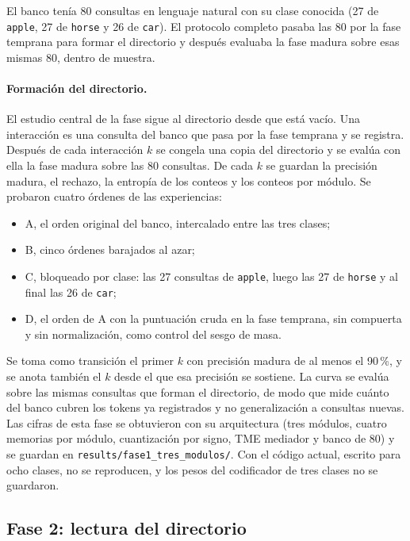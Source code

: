 El banco tenía 80 consultas en lenguaje natural con su clase conocida (27 de
\texttt{apple}, 27 de \texttt{horse} y 26 de \texttt{car}).
El protocolo completo pasaba las 80 por la fase temprana para formar el directorio y
después evaluaba la fase madura sobre esas mismas 80, dentro de muestra.

\paragraph{Formación del directorio.}
El estudio central de la fase sigue al directorio desde que está vacío.
Una interacción es una consulta del banco que pasa por la fase temprana y se registra.
Después de cada interacción $k$ se congela una copia del directorio y se evalúa con ella
la fase madura sobre las 80 consultas.
De cada $k$ se guardan la precisión madura, el rechazo, la entropía de los conteos y los
conteos por módulo.
Se probaron cuatro órdenes de las experiencias:
\begin{itemize}
    \item A, el orden original del banco, intercalado entre las tres clases;
    \item B, cinco órdenes barajados al azar;
    \item C, bloqueado por clase: las 27 consultas de \texttt{apple}, luego las 27 de
    \texttt{horse} y al final las 26 de \texttt{car};
    \item D, el orden de A con la puntuación cruda en la fase temprana, sin compuerta y
    sin normalización, como control del sesgo de masa.
\end{itemize}
Se toma como transición el primer $k$ con precisión madura de al menos el 90\,\%, y se
anota también el $k$ desde el que esa precisión se sostiene.
La curva se evalúa sobre las mismas consultas que forman el directorio, de modo que mide
cuánto del banco cubren los tokens ya registrados y no generalización a consultas
nuevas.
Las cifras de esta fase se obtuvieron con su arquitectura (tres módulos, cuatro memorias
por módulo, cuantización por signo, TME mediador y banco de 80) y se guardan en
\texttt{results/fase1\_tres\_modulos/}.
Con el código actual, escrito para ocho clases, no se reproducen, y los pesos del
codificador de tres clases no se guardaron.

\subsection{Fase 2: lectura del directorio}
\label{fase2:lectura}

